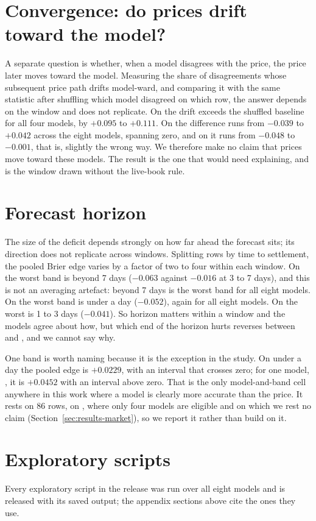 \section{Convergence: do prices drift toward the model?}
\label{app:convergence}
A separate question is whether, when a model disagrees with the price, the price
later moves toward the model. Measuring the share of disagreements whose
subsequent price path drifts model-ward, and comparing it with the same statistic
after shuffling which model disagreed on which row, the answer depends on the
window and does not replicate. On \winA the drift exceeds the shuffled
baseline for all four models, by $+0.095$ to $+0.111$. On \winB the difference
runs from $-0.039$ to $+0.042$ across the eight models, spanning zero, and on
\winC it runs from $-0.048$ to $-0.001$, that is, slightly the wrong way. We
therefore make no claim that prices move toward these models. The \winA result is
the one that would need explaining, and \winA is the window drawn without the
live-book rule.

\section{Forecast horizon}
\label{app:horizon}
The size of the deficit depends strongly on how far ahead the forecast sits; its
direction does not replicate across windows. Splitting rows by time to
settlement, the pooled Brier edge varies by a factor of two to four within each
window. On \winB the worst band is beyond 7 days ($-0.063$ against $-0.016$ at 3
to 7 days), and this is not an averaging artefact: beyond 7 days is the worst
band for all eight models. On \winC the worst band is under a day ($-0.052$),
again for all eight models. On \winA the worst is 1 to 3 days ($-0.041$). So
horizon matters within a window and the models agree about how, but which end of
the horizon hurts reverses between \winB and \winC, and we cannot say why.

One band is worth naming because it is the exception in the study. On \winA
under a day the pooled edge is $+0.0229$, with an interval that crosses zero;
for one model, \mKimiKTwoFive, it is $+0.0452$ with an interval above zero. That
is the only model-and-band cell anywhere in this work where a model is clearly
more accurate than the price. It rests on 86 rows, on \winA, where only four models are eligible and on which we rest no claim
(Section~\ref{sec:results-market}), so we report it rather than build on it.

\section{Exploratory scripts}
\label{app:exploratory}
Every exploratory script in the release was run over all eight models and is
released with its saved output; the appendix sections above cite the ones they
use.

